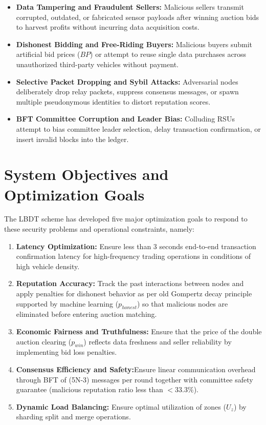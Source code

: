 \begin{itemize}
    \item \textbf{Data Tampering and Fraudulent Sellers:} Malicious sellers transmit corrupted, outdated, or fabricated sensor payloads after winning auction bids to harvest profits without incurring data acquisition costs.
    \item \textbf{Dishonest Bidding and Free-Riding Buyers:} Malicious buyers submit artificial bid prices ($BP$) or attempt to reuse single data purchases across unauthorized third-party vehicles without payment.
    \item \textbf{Selective Packet Dropping and Sybil Attacks:} Adversarial nodes deliberately drop relay packets, suppress consensus messages, or spawn multiple pseudonymous identities to distort reputation scores.
    \item \textbf{BFT Committee Corruption and Leader Bias:} Colluding RSUs attempt to bias committee leader selection, delay transaction confirmation, or insert invalid blocks into the ledger.
\end{itemize}

\section{System Objectives and Optimization Goals}\label{sec:problem_objectives}
\noindent The LBDT scheme has developed five major optimization goals to respond to these security problems and operational constraints, namely:
\begin{enumerate}
    \item \textbf{Latency Optimization:} Ensure less than 3 seconds end-to-end transaction confirmation latency for high-frequency trading operations in conditions of high vehicle density.
    \item \textbf{Reputation Accuracy:} Track the past interactions between nodes and apply penalties for dishonest behavior as per old Gompertz decay principle supported by machine learning ($p_{honest}$) so that malicious nodes are eliminated before entering auction matching.
    \item \textbf{Economic Fairness and Truthfulness:} Ensure that the price of the double auction clearing ($p_{win}$) reflects data freshness and seller reliability by implementing bid loss penalties.
    \item \textbf{Consensus Efficiency and Safety:}Ensure linear communication overhead through BFT of (5N-3) messages per round together with committee safety guarantee (malicious reputation ratio less than $< 33.3\%$).
    \item \textbf{Dynamic Load Balancing:} Ensure optimal utilization of zones ($U_z$) by  sharding split and merge operations.
\end{enumerate}
